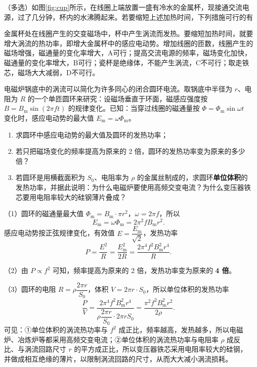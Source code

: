 \begin{liti}[2014·江苏卷]
（多选）如图\ref{fig:cup}所示，在线圈上端放置一盛有冷水的金属杯，现接通交流电源，过了几分钟，杯内的水沸腾起来。若要缩短上述加热时间，下列措施可行的有
\begin{jiexi}[2cm]
金属杯处在线圈产生的交变磁场中，杯中产生涡流而发热。要缩短加热时间，就要增大涡流的热功率，即增大金属杯中的感应电动势。增加线圈的匝数，线圈产生的磁场增强，磁通量的变化率增大，A可行；提高交流电源的频率，磁场变化加快，磁通量的变化率增大，B可行；瓷杯是绝缘体，不能产生涡流，C不可行；取走铁芯，磁场大大减弱，D不可行。
\end{jiexi}
\end{liti}

\begin{liti}
电磁炉锅底中的涡流可以简化为许多同心的闭合圆环电流。取锅底中半径为 $r$、电阻为 $R$ 的一个单匝圆环来研究：设磁场垂直于环面，磁感应强度按 $B=B_{\mathrm m}\sin(2\pi ft)$ 的规律变化。已知：当穿过线圈的磁通量按 $\Phi=\Phi_{\mathrm m}\sin\omega t$ 变化时，感应电动势的最大值 $E_{\mathrm m}=\omega\Phi_{\mathrm m}$。
\begin{enumerate}[label=（\arabic*）,leftmargin=2.6em]
  \item 求圆环中感应电动势的最大值及圆环的发热功率；
  \item 若只把磁场变化的频率提高为原来的 2 倍，圆环的发热功率变为原来的多少倍？
  \item 若圆环是用横截面积为 $S_0$、电阻率为 $\rho$ 的金属丝制成的，求圆环\textbf{单位体积}的发热功率，并据此说明：为什么电磁炉要使用高频交变电流？为什么变压器铁芯要用电阻率较大的硅钢薄片叠成？
\end{enumerate}
\begin{jiexi}[5cm]
（1）圆环的磁通量最大值 $\Phi_{\mathrm m}=B_{\mathrm m}\cdot\pi r^2$，$\omega=2\pi f$，所以
\[E_{\mathrm m}=\omega\Phi_{\mathrm m}=2\pi^2 fB_{\mathrm m}r^2 .\]
感应电动势按正弦规律变化，有效值 $E=\dfrac{E_{\mathrm m}}{\sqrt2}$，发热功率
\[P=\frac{E^2}{R}=\frac{E_{\mathrm m}^2}{2R}=\frac{2\pi^4f^2B_{\mathrm m}^2r^4}{R} .\]

（2）由 $P\propto f^2$ 可知，频率提高为原来的 2 倍，发热功率变为原来的 \textbf{4 倍}。

（3）圆环的电阻 $R=\rho\dfrac{2\pi r}{S_0}$，体积 $V=2\pi r\cdot S_0$，所以单位体积的发热功率
\[\frac{P}{V}=\frac{2\pi^4f^2B_{\mathrm m}^2r^4}{\rho\dfrac{2\pi r}{S_0}\cdot 2\pi rS_0}=\frac{\pi^2f^2B_{\mathrm m}^2r^2}{2\rho} .\]
可见：①单位体积的涡流热功率与 $f^2$ 成正比，频率越高，发热越多，所以电磁炉、冶炼炉等都采用高频交变电流；②单位体积的涡流热功率与电阻率 $\rho$ 成反比、与涡流回路尺寸 $r$ 的平方成正比，所以变压器铁芯采用电阻率较大的硅钢，并做成相互绝缘的薄片，以限制涡流回路的尺寸，从而大大减小涡流损耗。
\end{jiexi}
\end{liti}

